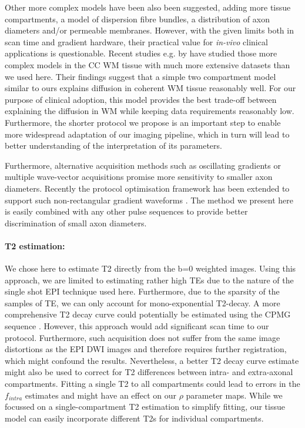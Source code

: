 Other more complex models have been also been suggested, adding more tissue compartments, a model of dispersion fibre bundles, a distribution of axon diameters and/or permeable membranes. However, with the given limits both in scan time and gradient hardware, their practical value for \emph{in-vivo} clinical applications is questionable. Recent studies e.g. by \citet{Panagiotaki:2012, Ferizi:2012} have studied those more complex models in the \gls{CC} WM tissue with much more extensive datasets than we used here. Their findings suggest that a simple two compartment model similar to ours explains diffusion in coherent WM tissue reasonably well. For our purpose of clinical adoption, this model provides the best trade-off between explaining the diffusion in WM while keeping data requirements reasonably low. Furthermore, the shorter protocol we propose is an important step to enable more widespread adaptation of our imaging pipeline, which in turn will lead to better understanding of the interpretation of its parameters.


Furthermore, alternative acquisition methods such as oscillating gradients \citep{Does:2003, Colvin:2008} or multiple wave-vector acquisitions \citep{Komlosh:2008,Koch:2008,Avram:2012} promise more sensitivity to smaller axon diameters. Recently the protocol optimisation framework has been extended to support such non-rectangular gradient waveforms \citep{Drobnjak:2010,Siow:2012a}. The method we present here is easily combined with any other pulse sequences to provide better discrimination of small axon diameters.

\paragraph{T2 estimation: } We chose here to estimate T2 directly from the b=0 weighted images. Using this approach, we are limited to estimating rather high \glspl{TE} due to the nature of the single shot EPI technique used here. Furthermore, due to the sparsity of the samples of \gls{TE}, we can only account for mono-exponential T2-decay. A more comprehensive T2 decay curve could potentially be estimated using the \gls{CPMG} sequence \citep{Pell:2006}. However, this approach would add significant scan time to our protocol. Furthermore, such acquisition does not suffer from the same image distortions as the EPI DWI images and therefore requires further registration, which might confound the results. Nevertheless, a better T2 decay curve estimate might also be used to correct for T2 differences between intra- and extra-axonal compartments. Fitting a single T2 to all compartments could lead to errors in  the $f_{intra}$ estimates and might have an effect on our $\rho$ parameter maps. While we focussed on a single-compartment T2 estimation to simplify fitting, our tissue model can easily incorporate different T2s for individual compartments. 

